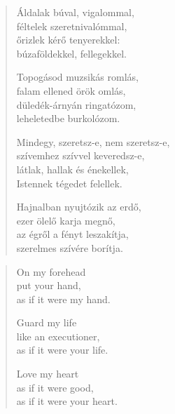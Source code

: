 \documentclass[11pt]{book}
\newcommand*{\centeredornament}{\centerline{\pgfornament[width=6cm]{88}}}
\begin{document}
\newpage

\vspace*{-15mm}
\centeredornament



\begin{verse}
  Áldalak búval, vigalommal, \\
  féltelek szeretnivalómmal, \\
  őrizlek kérő tenyerekkel: \\
  búzaföldekkel, fellegekkel.

  Topogásod muzsikás romlás, \\
  falam ellened örök omlás, \\
  düledék-árnyán ringatózom, \\
  leheletedbe burkolózom.

  Mindegy, szeretsz-e, nem szeretsz-e, \\
  szívemhez szívvel keveredsz-e, \\
  látlak, hallak és énekellek, \\
  Istennek tégedet felellek.

  Hajnalban nyujtózik az erdő, \\
  ezer ölelő karja megnő, \\
  az égről a fényt leszakítja, \\
  szerelmes szívére borítja.
\end{verse}

\newpage

\vspace*{-15mm}
\centeredornament



\begin{verse}
  On my forehead \\
  put your hand, \\
  as if it were my hand.

  Guard my life \\
  like an executioner, \\
  as if it were your life.

  Love my heart \\
  as if it were good, \\
  as if it were your heart.
\end{verse}

\newpage
\end{document}
